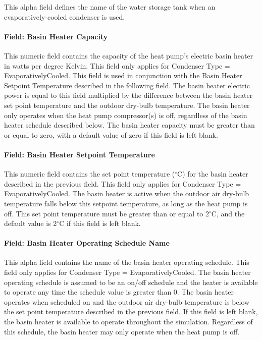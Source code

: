 This alpha field defines the name of the water storage tank when an evaporatively-cooled condenser is used.

\paragraph{Field: Basin Heater Capacity}\label{field-basin-heater-capacity-004}

This numeric field contains the capacity of the heat pump's electric basin heater in watts per degree Kelvin. This field only applies for Condenser Type = EvaporativelyCooled. This field is used in conjunction with the Basin Heater Setpoint Temperature described in the following field. The basin heater electric power is equal to this field multiplied by the difference between the basin heater set point temperature and the outdoor dry-bulb temperature. The basin heater only operates when the heat pump compressor(s) is off, regardless of the basin heater schedule described below. The basin heater capacity must be greater than or equal to zero, with a default value of zero if this field is left blank.

\paragraph{Field: Basin Heater Setpoint Temperature}\label{field-basin-heater-setpoint-temperature-004}

This numeric field contains the set point temperature ($^\circ$C) for the basin heater described in the previous field. This field only applies for Condenser Type = EvaporativelyCooled. The basin heater is active when the outdoor air dry-bulb temperature falls below this setpoint temperature, as long as the heat pump is off. This set point temperature must be greater than or equal to 2$^\circ$C, and the default value is 2$^\circ$C if this field is left blank.

\paragraph{Field: Basin Heater Operating Schedule Name}\label{field-basin-heater-operating-schedule-name-003}

This alpha field contains the name of the basin heater operating schedule. This field only applies for Condenser Type = EvaporativelyCooled. The basin heater operating schedule is assumed to be an on/off schedule and the heater is available to operate any time the schedule value is greater than 0. The basin heater operates when scheduled on and the outdoor air dry-bulb temperature is below the set point temperature described in the previous field. If this field is left blank, the basin heater is available to operate throughout the simulation. Regardless of this schedule, the basin heater may only operate when the heat pump is off.

